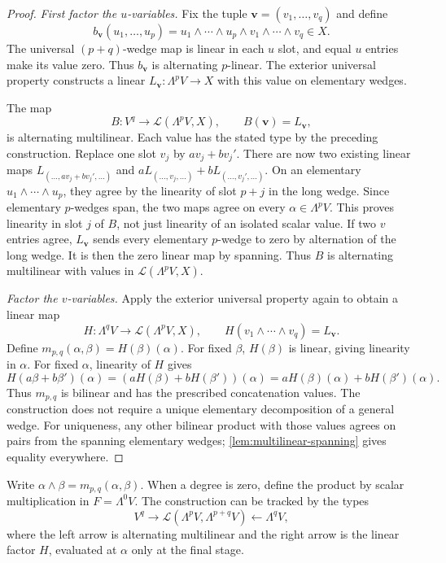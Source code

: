 \begin{proof}
\emph{First factor the $u$-variables.} Fix the tuple
$\mathbf v=(v_1,\ldots,v_q)$ and define
\[
b_{\mathbf v}(u_1,\ldots,u_p)
=u_1\wedge\cdots\wedge u_p\wedge v_1\wedge\cdots\wedge v_q\in X.
\]
The universal $(p+q)$-wedge map is linear in each $u$ slot, and equal
$u$ entries make its value zero. Thus $b_{\mathbf v}$ is alternating
$p$-linear. The exterior universal property constructs a linear
$L_{\mathbf v}:\Lambda^pV\to X$ with this value on elementary wedges.

The map
\[
B:V^q\to\mathcal L(\Lambda^pV,X),\qquad B(\mathbf v)=L_{\mathbf v},
\]
is alternating multilinear. Each value has the stated type by the preceding construction. Replace one
slot $v_j$ by $av_j+bv_j'$. There are now two existing linear maps
$L_{(\ldots,av_j+bv_j',\ldots)}$ and
$aL_{(\ldots,v_j,\ldots)}+bL_{(\ldots,v_j',\ldots)}$.
On an elementary $u_1\wedge\cdots\wedge u_p$, they agree by the
linearity of slot $p+j$ in the long wedge. Since elementary $p$-wedges
span, the two maps agree on every $\alpha\in\Lambda^pV$. This proves
linearity in slot $j$ of $B$, not just linearity of an isolated scalar value.
If two $v$ entries agree, $L_{\mathbf v}$ sends every elementary $p$-wedge
to zero by alternation of the long wedge. It is then the zero linear map
by spanning. Thus $B$ is alternating multilinear with values in
$\mathcal L(\Lambda^pV,X)$.

\emph{Factor the $v$-variables.} Apply the exterior universal property
again to obtain a linear map
\[
H:\Lambda^qV\to\mathcal L(\Lambda^pV,X),\qquad
H(v_1\wedge\cdots\wedge v_q)=L_{\mathbf v}.
\]
Define $m_{p,q}(\alpha,\beta)=H(\beta)(\alpha)$.
For fixed $\beta$, $H(\beta)$ is linear, giving linearity in $\alpha$.
For fixed $\alpha$, linearity of $H$ gives
\[
H(a\beta+b\beta')(\alpha)
=(aH(\beta)+bH(\beta'))(\alpha)
=aH(\beta)(\alpha)+bH(\beta')(\alpha).
\]
Thus $m_{p,q}$ is bilinear and has the prescribed concatenation values.
The construction does not require a unique elementary decomposition of a
general wedge.
For uniqueness, any other bilinear product with those values agrees on
pairs from the spanning elementary wedges; \cref{lem:multilinear-spanning}
gives equality everywhere.
\end{proof}
Write
$\alpha\wedge\beta=m_{p,q}(\alpha,\beta)$. When a degree is zero,
define the product by scalar multiplication in $F=\Lambda^0V$.
The construction can be tracked by the types
\[
V^q\longrightarrow\mathcal L(\Lambda^pV,\Lambda^{p+q}V)
\longleftarrow\Lambda^qV,
\]
where the left arrow is alternating multilinear and the right arrow is
the linear factor $H$, evaluated at $\alpha$ only at the final stage.

